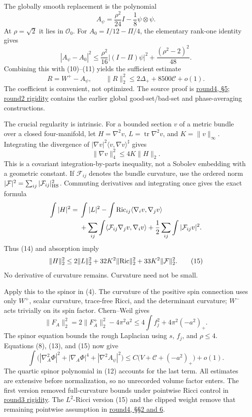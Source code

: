 \documentclass[
  english,
]{article}
\begin{document}
The globally smooth replacement is the polynomial \[
             A_\psi=\frac{\rho^2}{24}I-\frac18\psi\otimes\psi .
                                                               \tag{12}
\] At \(\rho=\sqrt2\) it lies in \(\mathcal O_0\). For
\(A_0=I/12-\Pi/4\), the elementary rank-one identity gives \[
 |A_\psi-A_0|^2
 \le\frac{\rho^2}{16}|(I-\Pi)\psi|^2
             +\frac{(\rho^2-2)^2}{48}.
\] Combining this with (10)--(11) yields the sufficient estimate \[
 R=W^+-A_\psi,\qquad
                    \|R\|_2^2\le2\Delta_++8500\mathcal C+o(1).
                                                               \tag{13}
\] The coefficient is convenient, not optimized. The source proof is
\href{../proofs/round4_rigidity.md}{round4, §5};
\href{../proofs/round2_rigidity.md}{round2 rigidity} contains the
earlier global good-set/bad-set and phase-averaging constructions.

The crucial regularity is intrinsic. For a bounded section \(v\) of a
metric bundle over a closed four-manifold, let \(H=\nabla^2v\),
\(L=\operatorname{tr}\nabla^2v\), and \(K=\|v\|_\infty\). Integrating
the divergence of \(|\nabla v|^2\langle v,\nabla v\rangle^\sharp\) gives
\[
                       \|\nabla v\|_4^2\le4K\|H\|_2.       \tag{14}
\] This is a covariant integration-by-parts inequality, not a Sobolev
embedding with a geometric constant. If \(\mathcal F_{ij}\) denotes the
bundle curvature, use the ordered norm
\(|\mathcal F|^2=\sum_{ij}|\mathcal F_{ij}|_{\rm HS}^2\). Commuting
derivatives and integrating once gives the exact formula \[
 \begin{aligned}
 \int|H|^2={}&\int|L|^2-
        \int{\rm Ric}_{ij}\langle\nabla_i v,\nabla_jv\rangle\\
 &+\sum_{ij}\int\langle\mathcal F_{ij}\nabla_jv,\nabla_i v\rangle
       +\frac12\sum_{ij}\int|\mathcal F_{ij}v|^2 .
 \end{aligned}
\] Thus (14) and absorption imply \[
 \|H\|_2^2\le2\|L\|_2^2+
                   32K^2\|{\rm Ric}\|_2^2+33K^2\|\mathcal F\|_2^2 .
                                                               \tag{15}
\] No derivative of curvature remains. Curvature need not be small.

Apply this to the spinor in (4). The curvature of the positive spin
connection uses only \(W^+\), scalar curvature, trace-free Ricci, and
the determinant curvature; \(W^-\) acts trivially on its spin factor.
Chern--Weil gives \[
 \|F_A\|_2^2=2\|F_A^+\|_2^2-4\pi^2a^2
       \le4\int f_j^2+4\pi^2(-a^2)_+ .
\] The spinor equation bounds the rough Laplacian using \(s\), \(f_j\),
and \(\rho\le4\). Equations (8), (13), and (15) now give \[
 \int\bigl(|\nabla_A^2\Phi|^2+|\nabla_A\Phi|^4+
                              |\nabla^2A_\psi|^2\bigr)
       \le C\bigl(V+\mathcal C+(-a^2)_+\bigr)+o(1).
                                                               \tag{16}
\] The quartic spinor polynomial in (12) accounts for the last term. All
estimates are extensive before normalization, so no unrecorded volume
factor enters. The first version removed full-curvature bounds under
pointwise Ricci control in \href{../proofs/round3_rigidity.md}{round3
rigidity}. The \(L^2\)-Ricci version (15) and the clipped weight remove
that remaining pointwise assumption in
\href{../proofs/round4_rigidity.md}{round4, §§2 and 6}.
\end{document}
